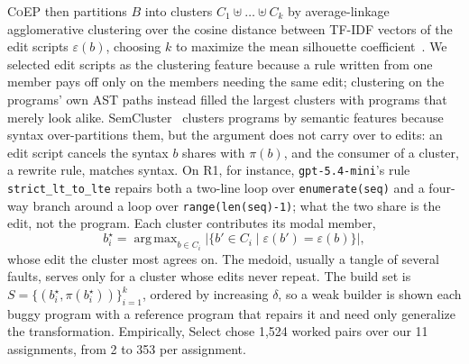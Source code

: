 \documentclass[acmsmall,screen,review,anonymous,nonacm]{acmart}
\DeclareMathOperator*{\argmax}{arg\,max}
\newcommand{\tool}{\textsc{CoEP}\xspace}
\newcommand{\gm}{\texttt{gpt-5.4-mini}\xspace}
\begin{document}
\tool then partitions $B$ into clusters $C_1 \uplus \dots \uplus C_k$ by average-linkage agglomerative clustering over the cosine distance between TF-IDF vectors of the edit scripts $\varepsilon(b)$, choosing $k$ to maximize the mean silhouette coefficient~\cite{rousseeuw1987silhouettes}. We selected edit scripts as the clustering feature because a rule written from one member pays off only on the members needing the same edit; clustering on the programs' own AST paths instead filled the largest clusters with programs that merely look alike. SemCluster~\cite{perry2019semcluster} clusters programs by semantic features because syntax over-partitions them, but the argument does not carry over to edits: an edit script cancels the syntax $b$ shares with $\pi(b)$, and the consumer of a cluster, a rewrite rule, matches syntax. On R1, for instance, \gm's rule \texttt{strict\_lt\_to\_lte} repairs both a two-line loop over \texttt{enumerate(seq)} and a four-way branch around a loop over \texttt{range(len(seq)-1)}; what the two share is the edit, not the program. Each cluster contributes its modal member,
\[
b^{\star}_i = \argmax_{b \in C_i} \big|\{ b' \in C_i \mid \varepsilon(b') = \varepsilon(b) \}\big|,
\]
whose edit the cluster most agrees on. The medoid, usually a tangle of several faults, serves only for a cluster whose edits never repeat. The build set is $S = \{(b^{\star}_i, \pi(b^{\star}_i))\}_{i=1}^{k}$, ordered by increasing $\delta$, so a weak builder is shown each buggy program with a reference program that repairs it and need only generalize the transformation. Empirically, Select chose 1{,}524 worked pairs over our 11 assignments, from 2 to 353 per assignment.
\end{document}
